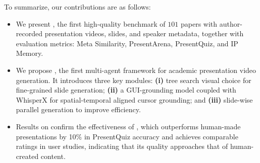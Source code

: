 \vspace{-0.4\baselineskip} 
To summarize, our contributions are as follows:
\vspace{-0.6\baselineskip} 
\begin{itemize}[leftmargin=*]
    \item We present \bench, the first high-quality benchmark of $101$ papers with author-recorded presentation videos, slides, and speaker metadata, together with evaluation metrics: Meta Similarity, PresentArena, PresentQuiz, and IP Memory.
    
    \vspace{-0.2\baselineskip} 
    \item We propose {\agent}, the first multi-agent framework for academic presentation video generation. It introduces three key modules: \textbf{(i)} tree search visual choice for fine-grained slide generation; \textbf{(ii)} a GUI-grounding model coupled with WhisperX for spatial-temporal aligned cursor grounding; and \textbf{(iii)} slide-wise parallel generation to improve efficiency.

    

    \vspace{-0.2\baselineskip} 
    \item Results on {\bench} confirm the effectiveness of {\agent}, which outperforms human-made presentations by 10\% in PresentQuiz accuracy and achieves comparable ratings in user studies, indicating that its quality approaches that of human-created content.
    
  
    
\end{itemize}







